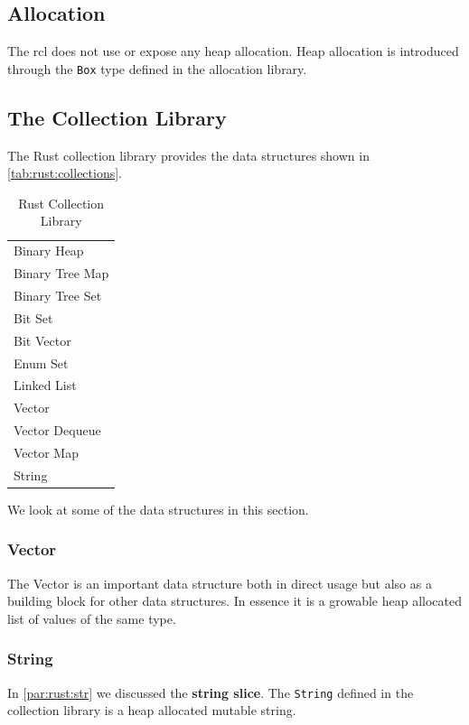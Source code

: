 \subsection{Allocation}
\label{sec:rust:allocation}

The \gls{rcl} does not use or expose any heap allocation.
Heap allocation is introduced through the \texttt{Box} type defined in the allocation library.

\subsection{The Collection Library}

The Rust collection library provides the data structures shown in \autoref{tab:rust:collections}.

\begin{table}[H]
  \begin{tabular}{l}
    Binary Heap \\
    Binary Tree Map \\
    Binary Tree Set \\
    Bit Set \\
    Bit Vector \\
    Enum Set \\
    Linked List \\
    Vector \\
    Vector Dequeue \\
    Vector Map \\
    String \\
  \end{tabular}
  \caption{Rust Collection Library}
  \label{tab:rust:collections}
\end{table}

We look at some of the data structures in this section.

\subsubsection{Vector}

The Vector is an important data structure both in direct usage but also as a building block for other data structures.
In essence it is a growable heap allocated list of values of the same type.

\subsubsection{String}

In \autoref{par:rust:str} we discussed the \textbf{string slice}.
The \texttt{String} defined in the collection library is a heap allocated mutable string.

